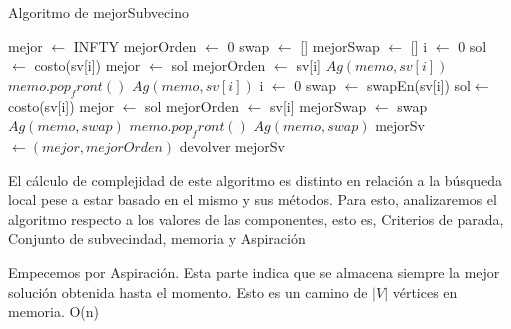 \documentclass[10pt,a4paper]{article}
\begin{document}
\begin{algorithm}[H]
\caption{Algoritmo de mejorSubvecino}
\begin{algorithmic}[1]
    \State mejor $\gets$ INFTY
    \State mejorOrden $\gets$ 0
    \State swap $\gets$ []
    \State mejorSwap $\gets$ []
        \State i $\gets$ 0
                sol $\gets$ costo(sv[i])
                    \State mejor $\gets$ sol
                    \State mejorOrden $\gets$ sv[i]
                \EndIf
            \EndIf
        \EndWhile
            \State $Ag(memo,sv[i])$
        \EndIf
            \State $memo.pop_front()$
            \State $Ag(memo,sv[i])$
        \EndIf
    \EndIf
        \State i $\gets$ 0
            \State swap $\gets$ swapEn(sv[i]) 
                sol$\gets$ costo(sv[i])
                    \State mejor $\gets$ sol
                    \State mejorOrden $\gets$ sv[i]
                    \State mejorSwap $\gets$ swap
                \EndIf
            \EndIf
         \EndWhile 
            \State $Ag(memo,swap)$
        \EndIf
            \State $memo.pop_front()$
            \State $Ag(memo,swap)$
        \EndIf
    \EndIf
\State mejorSv $\gets (mejor,mejorOrden)$
\State devolver mejorSv
\EndFunction
\end{algorithmic}
\end{algorithm}


El cálculo de complejidad de este algoritmo es distinto en relación a la búsqueda local pese a estar basado en el mismo y sus métodos. Para esto, analizaremos el algoritmo respecto a los valores de las componentes, esto es, Criterios de parada, Conjunto de subvecindad, memoria y Aspiración

Empecemos por Aspiración. Esta parte indica que se almacena siempre la mejor solución obtenida hasta el momento. Esto es un camino de $|V|$ vértices en memoria. O(n)
\end{document}
